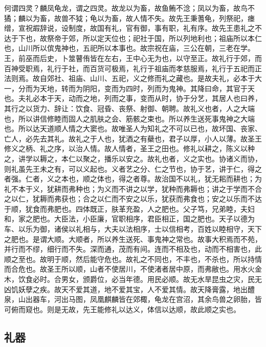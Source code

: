\documentclass[]{article}
\begin{document}
何谓四灵？麟凤龟龙，谓之四灵。故龙以为畜，故鱼鲔不淰；凤以为畜，故鸟不獝；麟以为畜，故兽不狘；龟以为畜，故人情不失。故先王秉蓍龟，列祭祀，瘗缯，宣祝嘏辞说，设制度，故国有礼，官有御，事有职，礼有序。故先王患礼之不达于下也，故祭帝于郊，所以定天位也；祀社于国，所以列地利也；祖庙所以本仁也，山川所以傧鬼神也，五祀所以本事也。故宗祝在庙，三公在朝，三老在学。王，前巫而后史，卜筮瞽侑皆在左右，王中心无为也，以守至正。故礼行于郊，而百神受职焉，礼行于社，而百货可极焉，礼行于祖庙而孝慈服焉，礼行于五祀而正法则焉。故自郊社、祖庙、山川、五祀，义之修而礼之藏也。是故夫礼，必本于大一，分而为天地，转而为阴阳，变而为四时，列而为鬼神。其降曰命，其官于天也。夫礼必本于天，动而之地，列而之事，变而从时，协于分艺，其居人也曰养，其行之以货力、辞让：饮食、冠昏、丧祭、射御、朝聘。故礼义也者，人之大端也，所以讲信修睦而固人之肌肤之会、筋骸之束也。所以养生送死事鬼神之大端也。所以达天道顺人情之大窦也。故唯圣人为知礼之不可以已也，故坏国、丧家、亡人，必先去其礼。故礼之于人也，犹酒之有蘗也，君子以厚，小人以薄。故圣王修义之柄、礼之序，以治人情。故人情者，圣王之田也。修礼以耕之，陈义以种之，讲学以耨之，本仁以聚之，播乐以安之。故礼也者，义之实也。协诸义而协，则礼虽先王未之有，可以义起也。义者艺之分、仁之节也，协于艺，讲于仁，得之者强。仁者，义之本也，顺之体也，得之者尊。故治国不以礼，犹无耜而耕也；为礼不本于义，犹耕而弗种也；为义而不讲之以学，犹种而弗耨也；讲之于学而不合之以仁，犹耨而弗获也；合之以仁而不安之以乐，犹获而弗食也；安之以乐而不达于顺，犹食而弗肥也。四体既正，肤革充盈，人之肥也。父子笃，兄弟睦，夫妇和，家之肥也。大臣法，小臣廉，官职相序，君臣相正，国之肥也。天子以德为车、以乐为御，诸侯以礼相与，大夫以法相序，士以信相考，百姓以睦相守，天下之肥也。是谓大顺。大顺者，所以养生送死、事鬼神之常也。故事大积焉而不苑，并行而不缪，细行而不失。深而通，茂而有间。连而不相及也，动而不相害也，此顺之至也。故明于顺，然后能守危也。故礼之不同也，不丰也，不杀也，所以持情而合危也。故圣王所以顺，山者不使居川，不使渚者居中原，而弗敝也。用水火金木，饮食必时。合男女，颁爵位，必当年德。用民必顺。故无水旱昆虫之灾，民无凶饥妖孽之疾。故天不爱其道，地不爱其宝，人不爱其情。故天降膏露，地出醴泉，山出器车，河出马图，凤凰麒麟皆在郊棷，龟龙在宫沼，其余鸟兽之卵胎，皆可俯而窥也。则是无故，先王能修礼以达义，体信以达顺，故此顺之实也。

\hypertarget{header-n407}{%
\subsection{礼器}\label{header-n407}}
\end{document}
